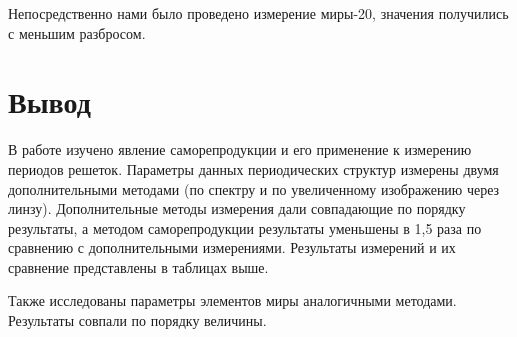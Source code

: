 \documentclass[a4paper]{article}
\begin{document}
Непосредственно нами было проведено измерение миры-20, значения получились с меньшим разбросом.

\newpage

	\vspace{20cm}


\section{Вывод}

В работе изучено явление саморепродукции и его применение к измерению периодов решеток. Параметры данных периодических структур измерены двумя дополнительными методами (по спектру и по увеличенному изображению через линзу). Дополнительные методы измерения дали совпадающие по порядку результаты, а методом саморепродукции результаты уменьшены в 1,5 раза по сравнению с дополнительными измерениями. Результаты измерений и их сравнение представлены в таблицах выше. 

Также исследованы параметры элементов миры аналогичными методами. Результаты совпали по порядку величины.
\end{document}
